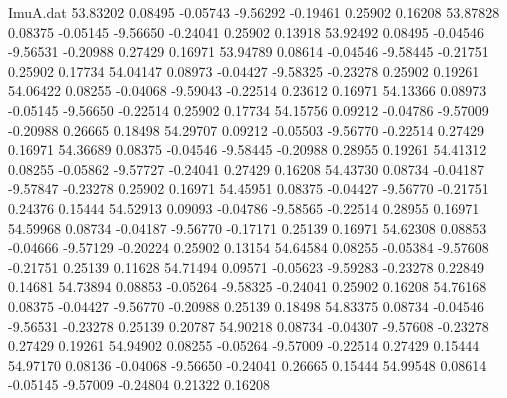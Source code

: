 \begin{filecontents}{ImuA.dat}
  53.83202    0.08495   -0.05743   -9.56292   -0.19461    0.25902    0.16208
  53.87828    0.08375   -0.05145   -9.56650   -0.24041    0.25902    0.13918
  53.92492    0.08495   -0.04546   -9.56531   -0.20988    0.27429    0.16971
  53.94789    0.08614   -0.04546   -9.58445   -0.21751    0.25902    0.17734
  54.04147    0.08973   -0.04427   -9.58325   -0.23278    0.25902    0.19261
  54.06422    0.08255   -0.04068   -9.59043   -0.22514    0.23612    0.16971
  54.13366    0.08973   -0.05145   -9.56650   -0.22514    0.25902    0.17734
  54.15756    0.09212   -0.04786   -9.57009   -0.20988    0.26665    0.18498
  54.29707    0.09212   -0.05503   -9.56770   -0.22514    0.27429    0.16971
  54.36689    0.08375   -0.04546   -9.58445   -0.20988    0.28955    0.19261
  54.41312    0.08255   -0.05862   -9.57727   -0.24041    0.27429    0.16208
  54.43730    0.08734   -0.04187   -9.57847   -0.23278    0.25902    0.16971
  54.45951    0.08375   -0.04427   -9.56770   -0.21751    0.24376    0.15444
  54.52913    0.09093   -0.04786   -9.58565   -0.22514    0.28955    0.16971
  54.59968    0.08734   -0.04187   -9.56770   -0.17171    0.25139    0.16971
  54.62308    0.08853   -0.04666   -9.57129   -0.20224    0.25902    0.13154
  54.64584    0.08255   -0.05384   -9.57608   -0.21751    0.25139    0.11628
  54.71494    0.09571   -0.05623   -9.59283   -0.23278    0.22849    0.14681
  54.73894    0.08853   -0.05264   -9.58325   -0.24041    0.25902    0.16208
  54.76168    0.08375   -0.04427   -9.56770   -0.20988    0.25139    0.18498
  54.83375    0.08734   -0.04546   -9.56531   -0.23278    0.25139    0.20787
  54.90218    0.08734   -0.04307   -9.57608   -0.23278    0.27429    0.19261
  54.94902    0.08255   -0.05264   -9.57009   -0.22514    0.27429    0.15444
  54.97170    0.08136   -0.04068   -9.56650   -0.24041    0.26665    0.15444
  54.99548    0.08614   -0.05145   -9.57009   -0.24804    0.21322    0.16208
\end{filecontents}
